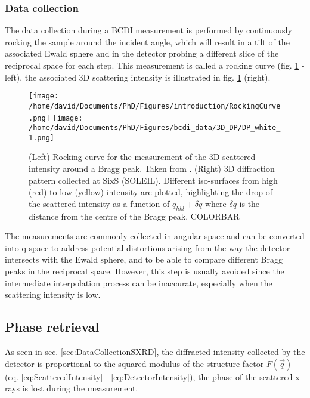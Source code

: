 \subsubsection{Data collection} \label{sec:DataCollectionBCDI}

The data collection during a BCDI measurement is performed by continuously rocking the sample around the incident angle, which will result in a tilt of the associated Ewald sphere and in the detector probing a different slice of the reciprocal space for each step.
This measurement is called a rocking curve (fig. \ref{fig:3DDP} - left), the associated 3D scattering intensity is illustrated in fig. \ref{fig:3DDP} (right).

\begin{figure}[!htb]
    \centering
    \texttt{[image: /home/david/Documents/PhD/Figures/introduction/RockingCurve.png]}
    \texttt{[image: /home/david/Documents/PhD/Figures/bcdi\_data/3D\_DP/DP\_white\_1.png]}
    \caption{
    (Left) Rocking curve for the measurement of the 3D scattered intensity around a Bragg peak. Taken from \cite{Willmott}.
    (Right) 3D diffraction pattern collected at SixS (SOLEIL).
    Different iso-surfaces from high (red) to low (yellow) intensity are plotted, highlighting the drop of the scattered intensity as a function of $q_{hkl}+\delta q$ where $\delta q$ is the distance from the centre of the Bragg peak.
    \textcolor{Important}{COLORBAR}
    }
    \label{fig:3DDP}
\end{figure}

The measurements are commonly collected in angular space and can be converted into q-space to address potential distortions arising from the way the detector intersects with the Ewald sphere, and to be able to compare different Bragg peaks in the reciprocal space.
However, this step is usually avoided since the intermediate interpolation process can be inaccurate, especially when the scattering intensity is low.

\subsection{Phase retrieval}\label{sec:PhaseRetrieval}

As seen in sec. \ref{sec:DataCollectionSXRD}, the diffracted intensity collected by the detector is proportional to the squared modulus of the structure factor $F(\vec{q})$ (eq. \ref{eq:ScatteredIntensity} - \ref{eq:DetectorIntensity}), the phase of the scattered x-rays is lost during the measurement.

